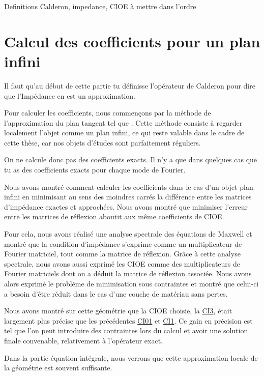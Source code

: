 \begin{REM}
  Definitions Calderon, impedance, CIOE à mettre dans l'ordre
\end{REM}

\chapter{Calcul des coefficients pour un plan infini}
\label{sec:plan}
\minitoc
\newpage
\begin{REM}
  Il faut qu'au début de cette partie tu définisse l’opérateur de Calderon pour dire que l’Impédance en est un approximation.
\end{REM}
Pour calculer les coefficients, nous commençons par la méthode de l'approximation du plan tangent tel que \cite{hoppe_impedance_1995,marceaux_high-order_2000,aubakirov_electromagnetic_2014}. Cette méthode consiste à regarder localement l'objet comme un plan infini, ce qui reste valable dans le cadre de cette thèse, car nos objets d'études sont parfaitement réguliers.
\begin{REM}
  On ne calcule donc pas des coefficients exacts. Il n'y a que dans quelques cas que tu as des coefficients exacts pour chaque mode de Fourier.
\end{REM}







Nous avons montré comment calculer les coefficients dans le cas d'un objet plan infini en minimisant au sens des moindres carrés la différence entre les matrices d'impédance exactes et approchées.
Nous avons montré que minimiser l'erreur entre les matrices de réflexion aboutit aux même coefficients de CIOE.

Pour cela, nous avons réalisé une analyse spectrale des équations de Maxwell et montré que la condition d'impédance s'exprime comme un multiplicateur de Fourier matriciel, tout comme la matrice de réflexion. Grâce à cette analyse spectrale, nous avons aussi exprimé les CIOE comme des multiplicateurs de Fourier matriciels dont on a déduit la matrice de réflexion associée. Nous avons alors exprimé le problème de minimisation sous contraintes et montré que celui-ci a besoin d'être réduit dans le cas d'une couche de matériau sans pertes.

Nous avons montré sur cette géométrie que la CIOE choisie, la \hyperlink{ci3}{CI3}, était largement plus précise que les précédentes \hyperlink{ci01}{CI01} et \hyperlink{ci1}{CI1}. Ce gain en précision est tel que l'on peut introduire des contraintes lors du calcul et avoir une solution finale convenable, relativement à l'opérateur exact.

Dans la partie équation intégrale, nous verrons que cette approximation locale de la géométrie est souvent suffisante.
